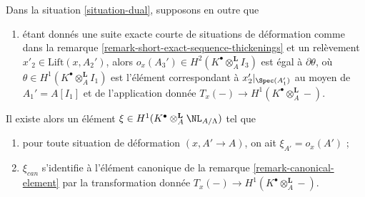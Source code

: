 \begin{lemma}
\label{lemma-dual-obstruction}
Dans la situation \ref{situation-dual}, supposons en outre que
\begin{enumerate}
\item[(iv)] étant donnés une suite exacte courte de situations de déformation
comme dans la remarque \ref{remark-short-exact-sequence-thickenings} et un
relèvement $x'_2 \in \text{Lift}(x, A_2')$, alors
$o_x(A_3') \in H^2(K^\bullet \otimes_A^\mathbf{L} I_3)$
est égal à $\partial\theta$, où
$\theta \in H^1(K^\bullet \otimes_A^\mathbf{L} I_1)$
est l'élément correspondant à $x'_2|_{\Spec(A_1')}$ au moyen de
$A_1' = A[I_1]$ et de l'application donnée
$T_x(-) \to H^1(K^\bullet \otimes_A^\mathbf{L} -)$.
\end{enumerate}
Il existe alors un élément
$\xi \in H^1(K^\bullet \otimes_A^\mathbf{L} \NL_{A/\Lambda})$
tel que
\begin{enumerate}
\item pour toute situation de déformation $(x, A' \to A)$, on ait
$\xi_{A'} = o_x(A')$ ;
\item $\xi_{can}$ s'identifie à l'élément canonique de la remarque
\ref{remark-canonical-element} par la transformation donnée
$T_x(-) \to H^1(K^\bullet \otimes_A^\mathbf{L} -)$.
\end{enumerate}
\end{lemma}

